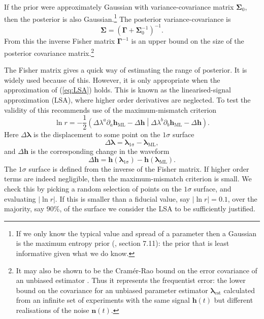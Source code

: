 \documentclass[useAMS,usedcolumn,usegraphicx,usenatbib]{mn2e}
\newcommand{\eqnref}[1]{(\ref{eq:#1})}
\newcommand{\sub}[1]{\ensuremath{_\mathrm{#1}}}
\newcommand{\recip}[1]{\ensuremath{\frac{1}{#1}}}
\newcommand{\innerprod}[2]{\ensuremath{\left({#1}\middle|{#2}\right)}}
\begin{document}
If the prior were approximately Gaussian with variance-covariance matrix $\boldsymbol{\Sigma}_0$, then the posterior is also Gaussian.\footnote{If we only know the typical value and spread of a parameter then a Gaussian is the maximum entropy prior (\citealt{Jaynes2003}, section 7.11): the prior that is least informative given what we do know.} The posterior variance-covariance is \citep{Cutler1994, Vallisneri2008}
\begin{equation}
\boldsymbol{\Sigma} = \left(\boldsymbol{\Gamma} + \boldsymbol{\Sigma}_0^{-1}\right)^{-1}.
\label{eq:Posterior_variance}
\end{equation}
From this the inverse Fisher matrix $\boldsymbol{\Gamma}^{-1}$ is an upper bound on the size of the posterior covariance matrix.\footnote{It may also be shown to be the Cram\'{e}r-Rao bound on the error covariance of an unbiased estimator \citep{Cutler1994, Vallisneri2008}. Thus it represents the frequentist error: the lower bound on the covariance for an unbiased parameter estimator $\boldsymbol{\lambda}\sub{est}$ calculated from an infinite set of experiments with the same signal $\boldsymbol{h}(t)$ but different realisations of the noise $\boldsymbol{n}(t)$.}

The Fisher matrix gives a quick way of estimating the range of posterior. It is widely used because of this. However, it is only appropriate when the approximation of \eqnref{LSA} holds. This is known as the linearised-signal approximation (LSA), where higher order derivatives are neglected. To test the validity of this \citet{Vallisneri2008} recommends use of the maximum-mismatch criterion
\begin{equation}
\ln r = -\recip{2}\innerprod{\Delta\lambda^a\partial_a\boldsymbol{h}\sub{ML} - \Delta\boldsymbol{h}}{\Delta\lambda^b\partial_b\boldsymbol{h}\sub{ML} - \Delta\boldsymbol{h}}.
\end{equation}
Here $\Delta \boldsymbol{\lambda}$ is the displacement to some point on the $1\sigma$ surface
\begin{equation}
\Delta \boldsymbol{\lambda} = \boldsymbol{\lambda}\sub{1\sigma} - \boldsymbol{\lambda}\sub{ML},
\end{equation}
and $\Delta \boldsymbol{h}$ is the corresponding change in the waveform
\begin{equation}
\Delta \boldsymbol{h} = \boldsymbol{h}(\boldsymbol{\lambda}\sub{1\sigma}) - \boldsymbol{h}(\boldsymbol{\lambda}\sub{ML}).
\end{equation}
The $1\sigma$ surface is defined from the inverse of the Fisher matrix. If higher order terms are indeed negligible, then the maximum-mismatch criterion is small. We check this by picking a random selection of points on the $1\sigma$ surface, and evaluating $|\ln r|$. If this is smaller than a fiducial value, say $|\ln r| = 0.1$, over the majority, say $90\%$, of the surface we consider the LSA to be sufficiently justified.
\end{document}
